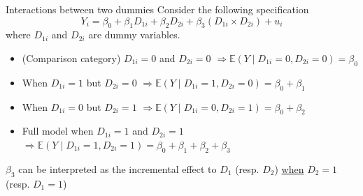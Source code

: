 \documentclass[notes,10pt, aspectratio=169]{beamer}
\begin{document}

\begin{frame}{Interactions between two dummies}
Consider the following specification
\begin{equation*}
    Y_i = \beta_0 + \beta_1 D_{1i} + \beta_2 D_{2i} + \beta_3 (D_{1i} \times D_{2i}) + u_i
\end{equation*}
where $D_{1i}$ and $D_{2i}$ are dummy variables.\\[1em]
\begin{itemize}
    \item (Comparison category) $D_{1i}=0$ and $D_{2i}=0$ $\Rightarrow \mathbb{E}(Y\mid D_{1i}=0, D_{2i}=0) = \beta_0$ 
    \item When $D_{1i}=1$ but $D_{2i}=0$ $\Rightarrow \mathbb{E}(Y\mid D_{1i}=1, D_{2i}=0) = \beta_0 + \beta_1$ 
    \item When $D_{1i}=0$ but $D_{2i}=1$ $\Rightarrow \mathbb{E}(Y\mid D_{1i}=0, D_{2i}=1) = \beta_0 + \beta_2$ 
    \item Full model when $D_{1i}=1$ and $D_{2i}=1$ $\Rightarrow \mathbb{E}(Y\mid D_{1i}=1, D_{2i}=1) = \beta_0 + \beta_1 + \beta_2 + \beta_3$ 
\end{itemize}
\vspace{1em}
$\beta_3$ can be interpreted as the incremental effect to $D_{1}$ (resp. $D_{2}$) \underline{when} $D_{2}=1$ (resp. $D_{1}=1$)
\end{frame}
\end{document}
